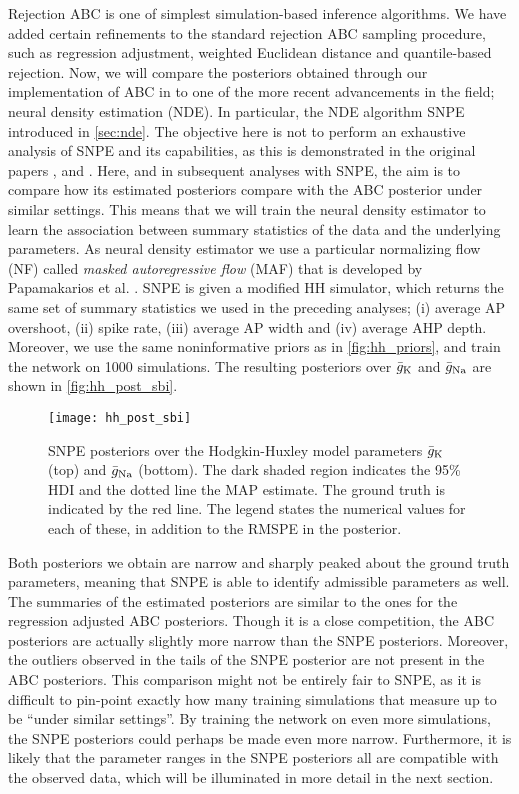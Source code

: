 Rejection ABC is one of simplest simulation-based inference algorithms. We have added certain refinements to the standard rejection ABC sampling procedure, such as regression adjustment, weighted Euclidean distance and quantile-based rejection. Now, we will compare the posteriors obtained through our implementation of ABC in  to one of the more recent advancements in the field; neural density estimation (NDE). In particular, the NDE algorithm SNPE introduced in \cref{sec:nde}. The objective here is not to perform an exhaustive analysis of SNPE and its capabilities, as this is demonstrated in the original papers \cite{SNL_first}, \cite{SNPE_first} and \cite{SNPE_apt}. Here, and in subsequent analyses with SNPE, the aim is to compare how its estimated posteriors compare with the ABC posterior under similar settings. This means that we will train the neural density estimator to learn the association between summary statistics of the data and the underlying parameters. As neural density estimator we use a particular normalizing flow (NF) called \textit{masked autoregressive flow} (MAF) that is developed by Papamakarios et al. \cite{MAF}. SNPE is given a modified HH simulator, which returns the same set of summary statistics we used in the preceding analyses; (i) average AP overshoot, (ii) spike rate, (iii) average AP width and (iv) average AHP depth. Moreover, we use the same noninformative priors as in \autoref{fig:hh_priors}, and train the network on 1000 simulations. The resulting posteriors over $\bar{g}_{\mathrm{K}}$ and $\bar{g}_{\mathrm{Na}}$ are shown in \autoref{fig:hh_post_sbi}.
\begin{figure}[H]
    \centering
    \texttt{[image: hh\_post\_sbi]}
    \caption{SNPE posteriors over the Hodgkin-Huxley model parameters $\bar{g}_{\mathrm{K}}$ (top) and $\bar{g}_{\mathrm{Na}}$ (bottom). The dark shaded region indicates the 95\% HDI and the dotted line the MAP estimate. The ground truth is indicated by the red line. The legend states the numerical values for each of these, in addition to the RMSPE in the posterior.}
    \label{fig:hh_post_sbi}
\end{figure}
Both posteriors we obtain are narrow and sharply peaked about the ground truth parameters, meaning that SNPE is able to identify admissible parameters as well. The summaries of the estimated posteriors are similar to the ones for the regression adjusted ABC posteriors. Though it is a close competition, the ABC posteriors are actually slightly more narrow than the SNPE posteriors. Moreover, the outliers observed in the tails of the SNPE posterior are not present in the ABC posteriors. This comparison might not be entirely fair to SNPE, as it is difficult to pin-point exactly how many training simulations that measure up to be “under similar settings”. By training the network on even more simulations, the SNPE posteriors could perhaps be made even more narrow. Furthermore, it is likely that the parameter ranges in the SNPE posteriors all are compatible with the observed data, which will be illuminated in more detail in the next section.


